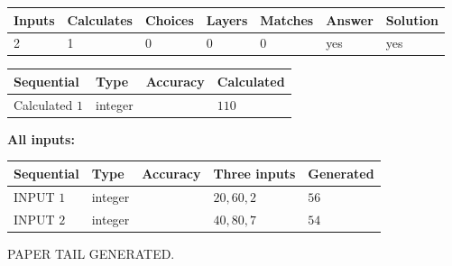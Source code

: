 \documentclass[12pt]{article}
\begin{document}
 
\noindent{}
 
 

 
   
   
   
   
\noindent\begin{tabular}{|l|l|l|l|l|l|l|}
 \hline
Inputs & Calculates & Choices & Layers & Matches & Answer & Solution \\ \hline
 2  & 
 1  & 
 0
  & 
 0  & 
 0  & 
  yes & 
  yes 
  \\ \hline
 \end{tabular}
   
   
   
   
\noindent{}
   
   
  
  
\noindent\begin{tabular}{|l|l|l|l|}
\hline
 Sequential & Type & Accuracy & Calculated \\ 
\hline
 
 
  Calculated $  1 $ & integer &  & 
  $ 110 $ 
 \\  \hline  
 \end{tabular}
   
   
   
   
\noindent\vspace{0.1in}\hspace{-0.08in} {\textbf{\Large{All inputs: }}}
   
   
  
  
\noindent\begin{tabular}{|l|l|l|l|l|}
\hline
 Sequential & Type & Accuracy & Three inputs & Generated \\ 
\hline
 
 
  INPUT $  1 $ & integer &  & $
 20
 , 
 60
 , 
 2
 $ & $ 56 $ 
 \\  \hline  
 
 
  INPUT $  2 $ & integer &  & $
 40
 , 
 80
 , 
 7
 $ & $ 54 $ 
 \\  \hline  
 \end{tabular}
   
   
   
   
   
   
 \vspace{0.2in}
 
   
   
\vspace{2.0in} PAPER TAIL GENERATED.
   
\end{document}
